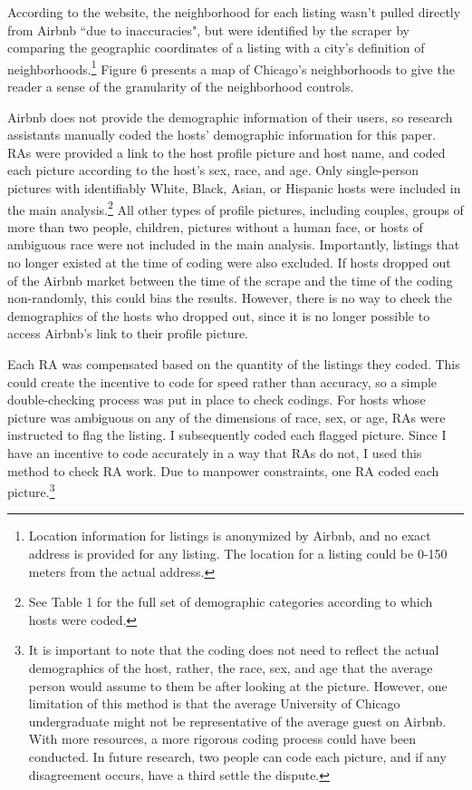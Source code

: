 \documentclass[11pt, oneside]{article}
\begin{document}
According to the website, the neighborhood for each listing wasn't pulled directly from Airbnb ``due to inaccuracies", but were identified by the scraper by comparing the geographic coordinates of a listing with a city's definition of neighborhoods.\footnote{Location information for listings is anonymized by Airbnb, and no exact address is provided for any listing. The location for a listing could be 0-150 meters from the actual address.} Figure 6 presents a map of Chicago's neighborhoods to give the reader a sense of the granularity of the neighborhood controls. 

Airbnb does not provide the demographic information of their users, so research assistants manually coded the hosts' demographic information for this paper. RAs were provided a link to the host profile picture and host name, and coded each picture according to the host's sex, race, and age. Only single-person pictures with identifiably White, Black, Asian, or Hispanic hosts were included in the main analysis.\footnote{See Table 1 for the full set of demographic categories according to which hosts were coded.} All other types of profile pictures, including couples, groups of more than two people, children, pictures without a human face, or hosts of ambiguous race were not included in the main analysis. Importantly, listings that no longer existed at the time of coding were also excluded. If hosts dropped out of the Airbnb market between the time of the scrape and the time of the coding non-randomly, this could bias the results. However, there is no way to check the demographics of the hosts who dropped out, since it is no longer possible to access Airbnb's link to their profile picture. 

Each RA was compensated based on the quantity of the listings they coded. This could create the incentive to code for speed rather than accuracy, so a simple double-checking process was put in place to check codings. For hosts whose picture was ambiguous on any of the dimensions of race, sex, or age, RAs were instructed to flag the listing. I subsequently coded each flagged picture. Since I have an incentive to code accurately in a way that RAs do not, I used this method to check RA work. Due to manpower constraints, one RA coded each picture.\footnote{It is important to note that the coding does not need to reflect the actual demographics of the host, rather, the race, sex, and age that the average person would assume to them be after looking at the picture. However, one limitation of this method is that the average University of Chicago undergraduate might not be representative of the average guest on Airbnb. With more resources, a more rigorous coding process could have been conducted. In future research, two people can code each picture, and if any disagreement occurs, have a third settle the dispute.}
\end{document}
